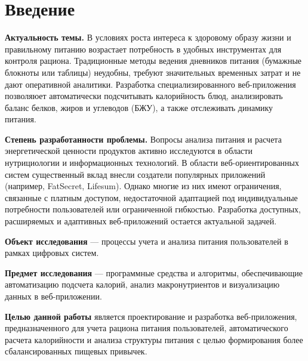 \section*{Введение}

\textbf{Актуальность темы.} В условиях роста интереса к здоровому образу жизни и правильному питанию возрастает потребность в удобных инструментах для контроля рациона. Традиционные методы ведения дневников питания (бумажные блокноты или таблицы) неудобны, требуют значительных временных затрат и не дают оперативной аналитики. Разработка специализированного веб-приложения позволяюет автоматически подсчитывать калорийность блюд, анализировать баланс белков, жиров и углеводов (БЖУ), а также отслеживать динамику питания.

\textbf{Степень разработанности проблемы.} Вопросы анализа питания и расчета энергетической ценности продуктов активно исследуются в области нутрициологии и информационных технологий. В области веб-ориентированных систем существенный вклад внесли создатели популярных приложений (например, FatSecret, Lifesum). Однако многие из них имеют ограничения, связанные с платным доступом, недостаточной адаптацией под индивидуальные потребности пользователей или ограниченной гибкостью. Разработка доступных, расширяемых и адаптивных веб-приложений остается актуальной задачей.

\textbf{Объект исследования} — процессы учета и анализа питания пользователей в рамках цифровых систем.

\textbf{Предмет исследования} — программные средства и алгоритмы, обеспечивающие автоматизацию подсчета калорий, анализ макронутриентов и визуализацию данных в веб-приложении.

\textbf{Целью данной работы} является проектирование и разработка веб-приложения, предназначенного для учета рациона питания пользователей, автоматического расчета калорийности и анализа структуры питания с целью формирования более сбалансированных пищевых привычек.
